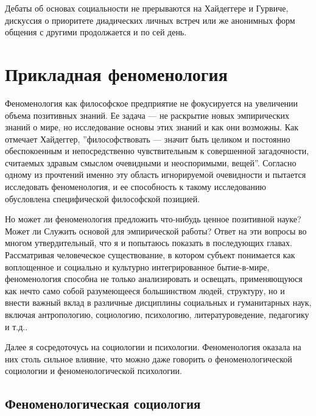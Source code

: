 \documentclass[11pt]{book}
\begin{document}
Дебаты об основах социальности не прерываются на Хайдеггере и Гурвиче, дискуссия о приоритете диадических личных встреч или же анонимных форм общения с другими продолжается и по сей день.

\part{Прикладная феноменология}

Феноменология как философское предприятие не фокусируется на увеличении объема позитивных знаний. Ее задача --- не раскрытие новых эмпирических знаний о мире, но исследование основы этих знаний и как они возможны. Как отмечает Хайдеггер, ''философствовать --- значит быть целиком и постоянно обеспокоенным и непосредственно чувствительным к совершенной загадочности, считаемых здравым смыслом очевидными и неоспоримыми, вещей''. Согласно одному из прочтений именно эту область игнорируемой очевидности и пытается исследовать феноменология, и ее способность к такому исследованию обусловлена специфической философской позицией.

Но может ли феноменология предложить что-нибудь ценное позитивной науке? Может ли Служить основой для эмпирической работы? Ответ на эти вопросы во многом утвердительный, что я и попытаюсь показать в последующих главах. Рассматривая человеческое существование, в котором субъект понимается как воплощенное и социально и культурно интегрированное бытие-в-мире, феноменология способна не только анализировать и освещать, применяющуюся как нечто само собой разумеющееся большинством людей, структуру, но и внести важный вклад в различные дисциплины социальных и гуманитарных наук, включая антропологию, социологию, психологию, литературоведение, педагогику и т.д..

Далее я сосредоточусь на социологии и психологии. Феноменология оказала на них столь сильное влияние, что можно даже говорить о феноменологической социологии и феноменологической психологии.

\chapter{Феноменологическая социология}
\end{document}
